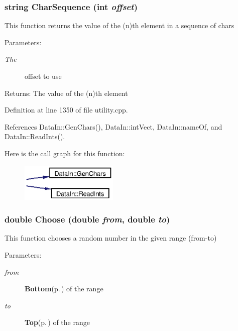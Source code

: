 \subsubsection{\setlength{\rightskip}{0pt plus 5cm}string Char\-Sequence (int {\em offset})}\label{utility_8h_a28}


This function returns the value of the (n)th element in a sequence of chars \begin{Desc}
\item[Parameters:]
\begin{description}
\item[{\em The}]offset to use \end{description}
\end{Desc}
\begin{Desc}
\item[Returns:]The value of the (n)th element \end{Desc}


Definition at line 1350 of file utility.cpp.

References Data\-In::Gen\-Chars(), Data\-In::int\-Vect, Data\-In::name\-Of, and Data\-In::Read\-Ints().

Here is the call graph for this function:\begin{figure}[H]
\begin{center}
\leavevmode
\includegraphics[width=132pt]{utility_8h_a28_cgraph}
\end{center}
\end{figure}
\subsubsection{\setlength{\rightskip}{0pt plus 5cm}double Choose (double {\em from}, double {\em to})}\label{utility_8h_a6}


This function chooses a random number in the given range (from-to) \begin{Desc}
\item[Parameters:]
\begin{description}
\item[{\em from}]{\bf Bottom}{\rm (p.\,\pageref{classBottom})} of the range \item[{\em to}]{\bf Top}{\rm (p.\,\pageref{classTop})} of the range \end{description}
\end{Desc}



